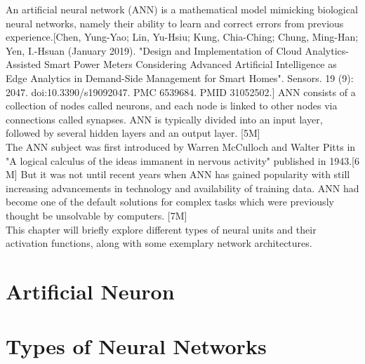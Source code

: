 An artificial neural network (ANN) is a mathematical model mimicking biological neural networks,
namely their ability to learn and correct errors from previous experience.[Chen, Yung-Yao; Lin, Yu-Hsiu; Kung, Chia-Ching; Chung, Ming-Han;
Yen, I.-Hsuan (January 2019). "Design and Implementation of Cloud Analytics-Assisted Smart Power Meters Considering Advanced Artificial Intelligence as
 Edge Analytics in Demand-Side Management for Smart Homes". Sensors. 19 (9): 2047. doi:10.3390/s19092047. PMC 6539684. PMID 31052502.]
ANN consists of a collection of nodes called neurons, and each node is linked to other nodes via connections called synapses.
ANN is typically divided into an input layer, followed by several hidden layers and an output layer. [5M] \\
The ANN subject was first introduced by Warren McCulloch and Walter Pitts in "A logical calculus of the ideas immanent in nervous activity" published in 1943.[6 M] But it was not until recent years when ANN has gained popularity with still increasing advancements in technology and availability of training data.
ANN had become one of the default solutions for complex tasks which were previously thought be unsolvable by computers. [7M] \\
This chapter will briefly explore different types of neural units and their activation functions, along with some exemplary network architectures.

\section{Artificial Neuron}

\section{Types of Neural Networks}

